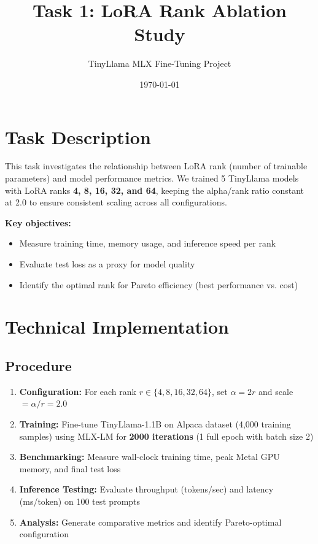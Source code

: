 \documentclass[11pt,a4paper]{article}
\title{\textbf{Task 1: LoRA Rank Ablation Study}}
\author{TinyLlama MLX Fine-Tuning Project}
\date{\today}
\begin{document}
\maketitle

\section*{Task Description}
This task investigates the relationship between LoRA rank (number of trainable parameters) and model performance metrics. We trained 5 TinyLlama models with LoRA ranks \textbf{4, 8, 16, 32, and 64}, keeping the alpha/rank ratio constant at 2.0 to ensure consistent scaling across all configurations.

\textbf{Key objectives:}
\begin{itemize}
    \item Measure training time, memory usage, and inference speed per rank
    \item Evaluate test loss as a proxy for model quality
    \item Identify the optimal rank for Pareto efficiency (best performance vs. cost)
\end{itemize}

\section*{Technical Implementation}

\subsection*{Procedure}
\begin{enumerate}
    \item \textbf{Configuration:} For each rank $r \in \{4, 8, 16, 32, 64\}$, set $\alpha = 2r$ and scale $= \alpha/r = 2.0$
    \item \textbf{Training:} Fine-tune TinyLlama-1.1B on Alpaca dataset (4,000 training samples) using MLX-LM for \textbf{2000 iterations} (1 full epoch with batch size 2)
    \item \textbf{Benchmarking:} Measure wall-clock training time, peak Metal GPU memory, and final test loss
    \item \textbf{Inference Testing:} Evaluate throughput (tokens/sec) and latency (ms/token) on 100 test prompts
    \item \textbf{Analysis:} Generate comparative metrics and identify Pareto-optimal configuration
\end{enumerate}
\end{document}
